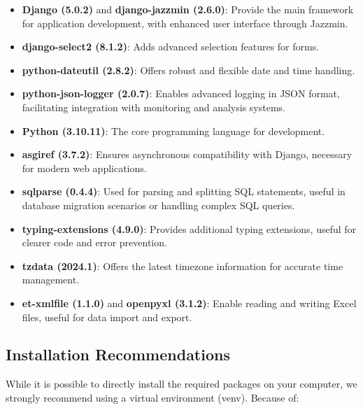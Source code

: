 \documentclass[12pt]{article}
\begin{document}
\begin{itemize}
    \item \textbf{Django (5.0.2)} and \textbf{django-jazzmin (2.6.0)}: Provide the main framework for application development, with enhanced user interface through Jazzmin.
    \item \textbf{django-select2 (8.1.2)}: Adds advanced selection features for forms.
    \item \textbf{python-dateutil (2.8.2)}: Offers robust and flexible date and time handling.
    \item \textbf{python-json-logger (2.0.7)}: Enables advanced logging in JSON format, facilitating integration with monitoring and analysis systems.
    \item \textbf{Python (3.10.11)}: The core programming language for development.
    \item \textbf{asgiref (3.7.2)}: Ensures asynchronous compatibility with Django, necessary for modern web applications.
    \item \textbf{sqlparse (0.4.4)}: Used for parsing and splitting SQL statements, useful in database migration scenarios or handling complex SQL queries.
    \item \textbf{typing-extensions (4.9.0)}: Provides additional typing extensions, useful for clearer code and error prevention.
    \item \textbf{tzdata (2024.1)}: Offers the latest timezone information for accurate time management.
    \item \textbf{et-xmlfile (1.1.0)} and \textbf{openpyxl (3.1.2)}: Enable reading and writing Excel files, useful for data import and export.
\end{itemize}

\newpage
\subsection{Installation Recommendations}

While it is possible to directly install the required packages on your computer, we strongly recommend using a virtual environment (venv). Because of:
\end{document}
